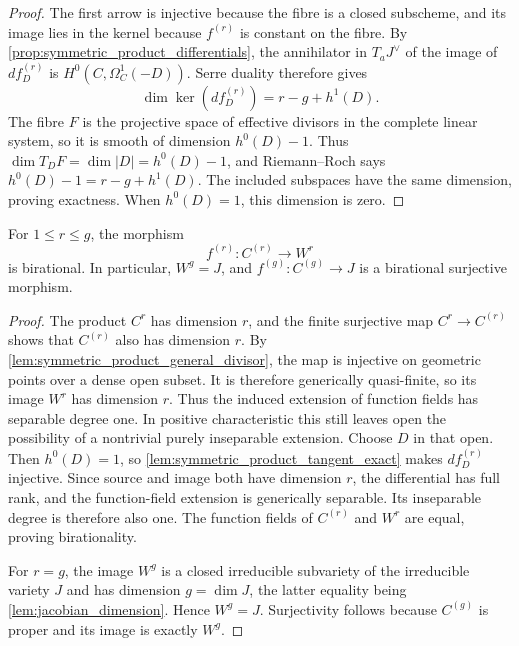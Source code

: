 \begin{proof}
  The first arrow is injective because the fibre is a closed subscheme, and
  its image lies in the kernel because \(f^{(r)}\) is constant on the
  fibre.  By \cref{prop:symmetric_product_differentials}, the annihilator
  in \(T_aJ^\vee\) of the image of \(d f^{(r)}_D\) is
  \(H^0(C,\Omega_C^1(-D))\).  Serre duality therefore gives
  \[
    \dim\ker(d f^{(r)}_D)=r-g+h^1(D).
  \]
  The fibre \(F\) is the projective space of effective divisors in the
  complete linear system, so it is smooth of dimension \(h^0(D)-1\).
  Thus \(\dim T_DF=\dim|D|=h^0(D)-1\), and Riemann--Roch says
  \(h^0(D)-1=r-g+h^1(D)\).  The included subspaces have the same
  dimension, proving exactness.  When \(h^0(D)=1\), this dimension is zero.
\end{proof}

\begin{lemma}
  \label{lem:symmetric_product_to_jacobian}

  For \(1\le r\le g\), the morphism
  \[
    f^{(r)}\colon C^{(r)}\longrightarrow W^r
  \]
  is birational.  In particular, \(W^g=J\), and
  \(f^{(g)}\colon C^{(g)}\to J\) is a birational surjective morphism.
\end{lemma}

\begin{proof}
  The product \(C^r\) has dimension \(r\), and the finite surjective map
  \(C^r\to C^{(r)}\) shows that \(C^{(r)}\) also has dimension \(r\).
  By \cref{lem:symmetric_product_general_divisor}, the map is injective on
  geometric points over a dense open subset.  It is therefore generically
  quasi-finite, so its image \(W^r\) has dimension \(r\).  Thus the induced
  extension of function fields has separable degree one.  In positive characteristic
  this still leaves open the possibility of a nontrivial purely
  inseparable extension.  Choose \(D\) in that open.  Then \(h^0(D)=1\),
  so \cref{lem:symmetric_product_tangent_exact} makes
  \(d f^{(r)}_D\) injective.  Since source and image both have dimension
  \(r\), the differential has full rank, and the function-field extension
  is generically separable.  Its inseparable degree is therefore also one.
  The function fields of \(C^{(r)}\) and \(W^r\) are equal, proving
  birationality.

  For \(r=g\), the image \(W^g\) is a closed irreducible subvariety of the
  irreducible variety \(J\) and has dimension \(g=\dim J\), the latter
  equality being \cref{lem:jacobian_dimension}.  Hence
  \(W^g=J\).  Surjectivity follows because \(C^{(g)}\) is proper and its
  image is exactly \(W^g\).
\end{proof}

